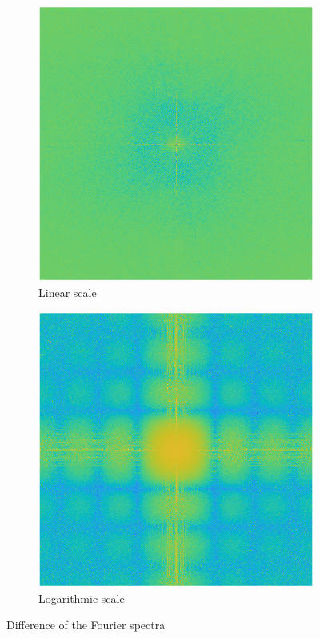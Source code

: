 \begin{figure}[!ht]
    \centering
    \hspace*{\fill}
    \begin{subfigure}{0.32\textwidth}
        \centering
        \includegraphics[width=\textwidth]{Doc/Graphics/Part1/Q18_FT_Spectrum.png}
        \caption{Linear scale}
    \end{subfigure}
    \hfill
    \begin{subfigure}{0.32\textwidth}
        \centering
        \includegraphics[width=\textwidth]{Doc/Graphics/Part1/Q18_FT_Spectrum_Log.png}
        \caption{Logarithmic scale}
    \end{subfigure}
    \hspace*{\fill}    
    \caption{Difference of the Fourier spectra}
    \label{fig:enter-label}
\end{figure}

